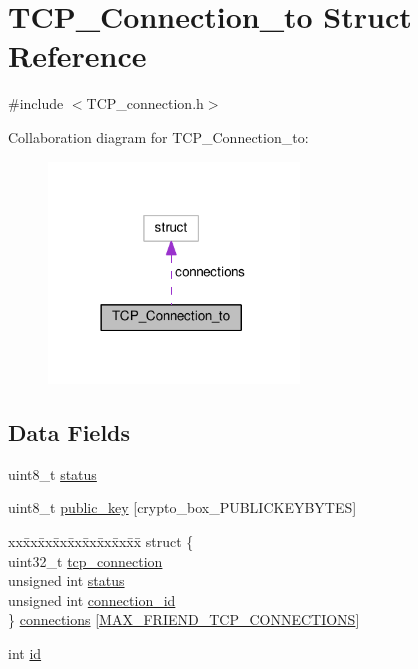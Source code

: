 \hypertarget{struct_t_c_p___connection__to}{\section{T\+C\+P\+\_\+\+Connection\+\_\+to Struct Reference}
\label{struct_t_c_p___connection__to}
}


{\ttfamily \#include $<$T\+C\+P\+\_\+connection.\+h$>$}



Collaboration diagram for T\+C\+P\+\_\+\+Connection\+\_\+to\+:
\nopagebreak
\begin{figure}[H]
\begin{center}
\leavevmode
\includegraphics[width=189pt]{d8/d40/struct_t_c_p___connection__to__coll__graph}
\end{center}
\end{figure}
\subsection*{Data Fields}
\begin{DoxyCompactItemize}
\item 
uint8\+\_\+t \hyperlink{struct_t_c_p___connection__to_ade818037fd6c985038ff29656089758d}{status}
\item 
uint8\+\_\+t \hyperlink{struct_t_c_p___connection__to_aaa806bb1136fb3d4b5d8d8970b596ff7}{public\+\_\+key} \mbox{[}crypto\+\_\+box\+\_\+\+P\+U\+B\+L\+I\+C\+K\+E\+Y\+B\+Y\+T\+E\+S\mbox{]}
\item 
\begin{tabbing}
xx\=xx\=xx\=xx\=xx\=xx\=xx\=xx\=xx\=\kill
struct \{\\
\>uint32\_t \hyperlink{struct_t_c_p___connection__to_a36999f2346dd09dd7c3135fe135404ae}{tcp\_connection}\\
\>unsigned int \hyperlink{struct_t_c_p___connection__to_aeed08ea57af6f7be240e2bf66162389f}{status}\\
\>unsigned int \hyperlink{struct_t_c_p___connection__to_ababc90484b0c796e004410411e723f5e}{connection\_id}\\
\} \hyperlink{struct_t_c_p___connection__to_a18a4dcc3680af788c1caa33edf6d893f}{connections} \mbox{[}\hyperlink{_t_c_p__connection_8h_a8ee1e3e61abfebc476a63a83ec2c05ee}{MAX\_FRIEND\_TCP\_CONNECTIONS}\mbox{]}\\

\end{tabbing}\item 
int \hyperlink{struct_t_c_p___connection__to_a7441ef0865bcb3db9b8064dd7375c1ea}{id}
\end{DoxyCompactItemize}


